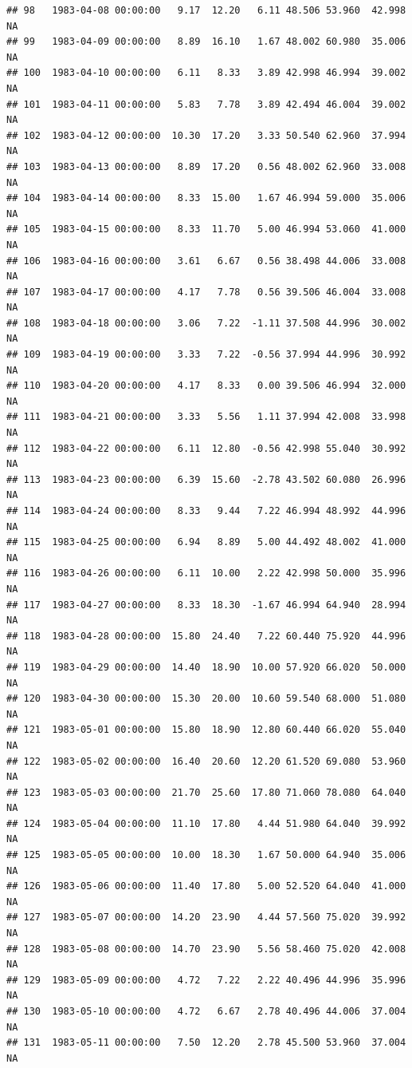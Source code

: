 \documentclass{article}\usepackage{graphicx, color}
\makeatletter
\newenvironment{kframe}{%
 \def\at@end@of@kframe{}%
 \ifinner\ifhmode%
  \def\at@end@of@kframe{\end{minipage}}%
  \begin{minipage}{\columnwidth}%
 \fi\fi%
 \def\FrameCommand##1{\hskip\@totalleftmargin \hskip-\fboxsep
 \colorbox{shadecolor}{##1}\hskip-\fboxsep
     \hskip-\linewidth \hskip-\@totalleftmargin \hskip\columnwidth}%
 \MakeFramed {\advance\hsize-\width
   \@totalleftmargin\z@ \linewidth\hsize
   \@setminipage}}%
 {\par\unskip\endMakeFramed%
 \at@end@of@kframe}
\newenvironment{knitrout}{}{} %
\makeatother
\begin{document}
\begin{knitrout}
\begin{kframe}
\begin{verbatim}
## 98   1983-04-08 00:00:00   9.17  12.20   6.11 48.506 53.960  42.998     NA
## 99   1983-04-09 00:00:00   8.89  16.10   1.67 48.002 60.980  35.006     NA
## 100  1983-04-10 00:00:00   6.11   8.33   3.89 42.998 46.994  39.002     NA
## 101  1983-04-11 00:00:00   5.83   7.78   3.89 42.494 46.004  39.002     NA
## 102  1983-04-12 00:00:00  10.30  17.20   3.33 50.540 62.960  37.994     NA
## 103  1983-04-13 00:00:00   8.89  17.20   0.56 48.002 62.960  33.008     NA
## 104  1983-04-14 00:00:00   8.33  15.00   1.67 46.994 59.000  35.006     NA
## 105  1983-04-15 00:00:00   8.33  11.70   5.00 46.994 53.060  41.000     NA
## 106  1983-04-16 00:00:00   3.61   6.67   0.56 38.498 44.006  33.008     NA
## 107  1983-04-17 00:00:00   4.17   7.78   0.56 39.506 46.004  33.008     NA
## 108  1983-04-18 00:00:00   3.06   7.22  -1.11 37.508 44.996  30.002     NA
## 109  1983-04-19 00:00:00   3.33   7.22  -0.56 37.994 44.996  30.992     NA
## 110  1983-04-20 00:00:00   4.17   8.33   0.00 39.506 46.994  32.000     NA
## 111  1983-04-21 00:00:00   3.33   5.56   1.11 37.994 42.008  33.998     NA
## 112  1983-04-22 00:00:00   6.11  12.80  -0.56 42.998 55.040  30.992     NA
## 113  1983-04-23 00:00:00   6.39  15.60  -2.78 43.502 60.080  26.996     NA
## 114  1983-04-24 00:00:00   8.33   9.44   7.22 46.994 48.992  44.996     NA
## 115  1983-04-25 00:00:00   6.94   8.89   5.00 44.492 48.002  41.000     NA
## 116  1983-04-26 00:00:00   6.11  10.00   2.22 42.998 50.000  35.996     NA
## 117  1983-04-27 00:00:00   8.33  18.30  -1.67 46.994 64.940  28.994     NA
## 118  1983-04-28 00:00:00  15.80  24.40   7.22 60.440 75.920  44.996     NA
## 119  1983-04-29 00:00:00  14.40  18.90  10.00 57.920 66.020  50.000     NA
## 120  1983-04-30 00:00:00  15.30  20.00  10.60 59.540 68.000  51.080     NA
## 121  1983-05-01 00:00:00  15.80  18.90  12.80 60.440 66.020  55.040     NA
## 122  1983-05-02 00:00:00  16.40  20.60  12.20 61.520 69.080  53.960     NA
## 123  1983-05-03 00:00:00  21.70  25.60  17.80 71.060 78.080  64.040     NA
## 124  1983-05-04 00:00:00  11.10  17.80   4.44 51.980 64.040  39.992     NA
## 125  1983-05-05 00:00:00  10.00  18.30   1.67 50.000 64.940  35.006     NA
## 126  1983-05-06 00:00:00  11.40  17.80   5.00 52.520 64.040  41.000     NA
## 127  1983-05-07 00:00:00  14.20  23.90   4.44 57.560 75.020  39.992     NA
## 128  1983-05-08 00:00:00  14.70  23.90   5.56 58.460 75.020  42.008     NA
## 129  1983-05-09 00:00:00   4.72   7.22   2.22 40.496 44.996  35.996     NA
## 130  1983-05-10 00:00:00   4.72   6.67   2.78 40.496 44.006  37.004     NA
## 131  1983-05-11 00:00:00   7.50  12.20   2.78 45.500 53.960  37.004     NA

\end{verbatim}
\end{kframe}
\end{knitrout}
\end{document}
